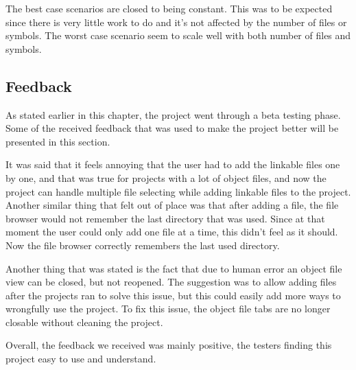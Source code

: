 The best case scenarios are closed to being constant. This was to be expected since there is very little work to do and it’s not affected by the number of files or symbols. The worst case scenario seem to scale well with both number of files and symbols.

\subsection{Feedback}
\label{sec:feedback}

As stated earlier in this chapter, the project went through a beta testing phase.  Some of the received feedback that was used to make the project better will be presented in this section.

It was said that it feels annoying that the user had to add the linkable files one by one, and that was true for projects with a lot of object files, and now the project can handle multiple file selecting while adding linkable files to the project. Another similar thing that felt out of place was that after adding a file, the file browser would not remember the last directory that was used. Since at that moment the user could only add one file at a time, this didn't feel as it should. Now the file browser correctly remembers the last used directory.

Another thing that was stated is the fact that due to human error an object file view can be closed, but not reopened. The suggestion was to allow adding files after the projects ran to solve this issue, but this could easily add more ways to wrongfully use the project. To fix this issue, the object file tabs are no longer closable without cleaning the project.

Overall, the feedback we received was mainly positive, the testers finding this project easy to use and understand.